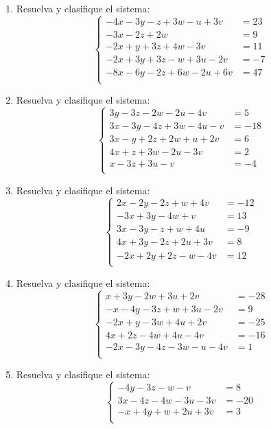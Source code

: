 \documentclass[11pt]{article}
\begin{document}
\begin{enumerate}
\[\begin{aligned}
-4x+y+z+w+3v&=-23\\
3x-2y-2z+3w-u-v&=3\\
-2x-3y-z+3w-2u+v&=-21\\
\end{aligned}\right.
\]
\item Resuelva y clasifique el sistema:
\[
\left\{\begin{aligned}
-4x-3y-z+3w-u+3v&=23\\
-3x-2z+2w&=9\\
-2x+y+3z+4w-3v&=11\\
-2x+3y+3z-w+3u-2v&=-7\\
-8x-6y-2z+6w-2u+6v&=47\\
\end{aligned}\right.
\]
\item Resuelva y clasifique el sistema:
\[
\left\{\begin{aligned}
3y-3z-2w-2u-4v&=5\\
3x-3y-4z+3w-4u-v&=-18\\
3x-y+2z+2w+u+2v&=6\\
4x+z+3w-2u-3v&=2\\
x-3z+3u-v&=-4\\
\end{aligned}\right.
\]
\item Resuelva y clasifique el sistema:
\[
\left\{\begin{aligned}
2x-2y-2z+w+4v&=-12\\
-3x+3y-4w+v&=13\\
3x-3y-z+w+4u&=-9\\
4x+3y-2z+2u+3v&=8\\
-2x+2y+2z-w-4v&=12\\
\end{aligned}\right.
\]
\item Resuelva y clasifique el sistema:
\[
\left\{\begin{aligned}
x+3y-2w+3u+2v&=-28\\
-x-4y-3z+w+3u-2v&=9\\
-2x+y-3w+4u+2v&=-25\\
4x+2z-4w+4u-4v&=-16\\
-2x-3y-4z-3w-u-4v&=1\\
\end{aligned}\right.
\]
\item Resuelva y clasifique el sistema:
\[
\left\{\begin{aligned}
-4y-3z-w-v&=8\\
3x-4z-4w-3u-3v&=-20\\
-x+4y+w+2u+3v&=3\\

\end{aligned}\]
\end{enumerate}
\end{document}
